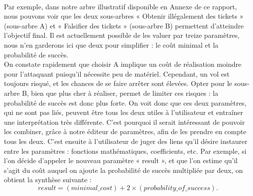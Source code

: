 			\paragraph{}
			Par exemple, dans notre arbre illustratif disponible en Annexe de ce rapport, nous pouvons voir que les deux sous-arbres « Obtenir illégalement des tickets » (sous-arbre A) et « Falsifier des tickets » (sous-arbre B) permettent d'atteindre l'objectif final. Il est actuellement possible de les valuer par treize paramètres, nous n'en garderons ici que deux pour simplifier : le coût minimal et la probabilité de succès.\\ %

			On constate rapidement que choisir A implique un coût de réalisation moindre pour l'attaquant puisqu'il nécessite peu de matériel. Cependant, un vol est toujours risqué, et les chances de se faire arrêter sont élevées. Opter pour le sous-arbre B, bien que plus cher à réaliser, permet de limiter ces risques : la probabilité de succès est donc plus forte. On voit donc que ces deux paramètres, qui ne sont pas liés, peuvent être tous les deux utiles à l'utilisateur et entraîner une interprétation très différente. C'est pourquoi il serait intéressant de pouvoir les combiner, grâce à notre éditeur de paramètres, afin de les prendre en compte tous les deux. C'est ensuite à l'utilisateur de juger des liens qu'il désire instaurer entre les paramètres : fonctions mathématiques, coefficients, etc. Par exemple, si l'on décide d'appeler le nouveau paramètre « result », et que l'on estime qu'il s'agit du coût auquel on ajoute la probabilité de succès multipliée par deux, on obtient la synthèse suivante : \[ result = (minimal\_cost) + 2 \times (probability\_of\_success).\]
